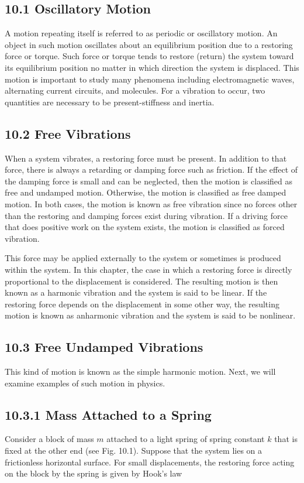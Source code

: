 \documentclass[10pt]{article}
\begin{document}
\subsection*{10.1 Oscillatory Motion}
A motion repeating itself is referred to as periodic or oscillatory motion. An object in such motion oscillates about an equilibrium position due to a restoring force or torque. Such force or torque tends to restore (return) the system toward its equilibrium position no matter in which direction the system is displaced. This motion is important to study many phenomena including electromagnetic waves, alternating current circuits, and molecules. For a vibration to occur, two quantities are necessary to be present-stiffness and inertia.

\subsection*{10.2 Free Vibrations}
When a system vibrates, a restoring force must be present. In addition to that force, there is always a retarding or damping force such as friction. If the effect of the damping force is small and can be neglected, then the motion is classified as free and undamped motion. Otherwise, the motion is classified as free damped motion. In both cases, the motion is known as free vibration since no forces other than the restoring and damping forces exist during vibration. If a driving force that does positive work on the system exists, the motion is classified as forced vibration.

This force may be applied externally to the system or sometimes is produced within the system. In this chapter, the case in which a restoring force is directly proportional to the displacement is considered. The resulting motion is then known as a harmonic vibration and the system is said to be linear. If the restoring force depends on the displacement in some other way, the resulting motion is known as anharmonic vibration and the system is said to be nonlinear.

\subsection*{10.3 Free Undamped Vibrations}
This kind of motion is known as the simple harmonic motion. Next, we will examine examples of such motion in physics.

\subsection*{10.3.1 Mass Attached to a Spring}
Consider a block of mass $m$ attached to a light spring of spring constant $k$ that is fixed at the other end (see Fig. 10.1). Suppose that the system lies on a frictionless horizontal surface. For small displacements, the restoring force acting on the block by the spring is given by Hook's law
\end{document}
